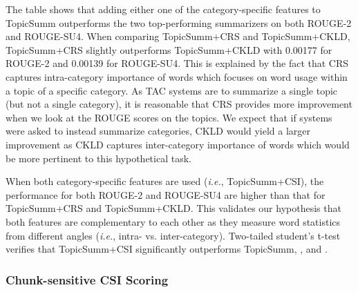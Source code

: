 The table shows that adding either one of the category-specific features to TopicSumm outperforms the two top-performing summarizers on both ROUGE-2 and ROUGE-SU4. When comparing TopicSumm+CRS and TopicSumm+CKLD, TopicSumm+CRS slightly outperforms TopicSumm+CKLD with 0.00177 for ROUGE-2 and 0.00139 for ROUGE-SU4. 
This is explained by the fact that CRS captures intra-category importance of words which focuses on word usage within a topic of a specific category.
As TAC systems are to summarize a single topic (but not a single category), it is reasonable that CRS provides more improvement when we look at the ROUGE scores on the topics.
We expect that if systems were asked to instead summarize categories, CKLD would yield a larger improvement as CKLD captures inter-category importance of words which would be more pertinent to this hypothetical task.

When both category-specific features are used ({\it i.e.}, TopicSumm+CSI), the performance for both ROUGE-2 and ROUGE-SU4 are higher than that for TopicSumm+CRS and TopicSumm+CKLD. This validates our hypothesis that both features are complementary to each other as they measure word statistics from different angles ({\it i.e.}, intra- vs. inter-category). 
Two-tailed student's t-test verifies that TopicSumm+CSI significantly outperforms TopicSumm, \CLASSY, and \POLYCOM.
 
\subsubsection{Chunk-sensitive CSI Scoring}

